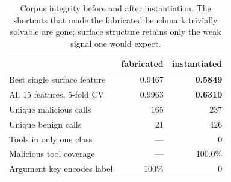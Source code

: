 \begin{table}[!htbp]
\centering\small
\caption{Corpus integrity before and after instantiation. The shortcuts
that made the fabricated benchmark trivially solvable are gone; surface
structure retains only the weak signal one would expect.}
\label{tab:integrity}
\begin{tabular}{lrr}
\toprule
 & fabricated & instantiated \\
\midrule
Best single surface feature  & 0.9467 & \textbf{0.5849} \\
All 15 features, 5-fold CV   & 0.9963 & \textbf{0.6310} \\
\midrule
Unique malicious calls       &    165 &    237 \\
Unique benign calls          &     21 &    426 \\
Tools in only one class      &      — &      0 \\
Malicious tool coverage      &      — & 100.0\% \\
Argument key encodes label   &   100\% &      0 \\
\bottomrule
\end{tabular}
\end{table}
